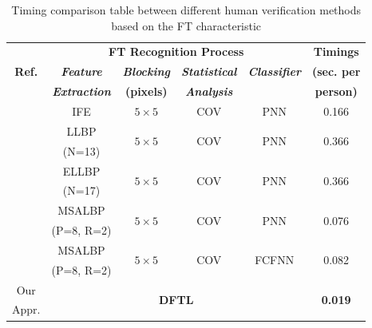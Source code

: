 \documentclass[conference]{IEEEtran}
\begin{document}
\begin{table}[]
\centering
\caption{Timing comparison table between different human verification methods based on the FT characteristic}
\label{Table:timing}
\begin{tabular}{|c|c|c|c|c|c|}
\hline
\multirow{3}{*}{\textbf{Ref.}} & \multicolumn{4}{c|}{\textbf{FT Recognition Process}} & \textbf{Timings} \\ \cline{2-5}
& \textbf{\textit{Feature}} &  \textbf{\textit{Blocking}} & \textbf{\textit{Statistical}} & \textbf{\textit{Classifier}} & \textbf{(sec. per}   \\ 
 & \textbf{\textit{Extraction}} & \textbf{(pixels)}&  \textbf{\textit{Analysis}} & & \textbf{person)}  \\ \hline
\cite{Al-Nima2015Human} &  IFE & $5 \times 5$ & COV & PNN & 0.166\\ \hline
\multirow{2}{*}{\cite{Al-Nima2017efficient}} & LLBP \cite{Petpon2009Face}  & \multirow{2}{*}{$5 \times 5$} & \multirow{2}{*}{COV} & \multirow{2}{*}{PNN} & \multirow{2}{*}{0.366}\\ 
& (N=13) & & & &\\ \hline
\multirow{2}{*}{\cite{Al-Nima2016Robust}}  & ELLBP  & \multirow{2}{*}{$5 \times 5$} & \multirow{2}{*}{COV} & \multirow{2}{*}{PNN} & \multirow{2}{*}{0.366}\\ 
& (N=17)  & & & &\\ \hline
\multirow{2}{*}{\cite{Al-Nima2017finger}} & MSALBP& \multirow{2}{*}{$5 \times 5$} & \multirow{2}{*}{COV} & \multirow{2}{*}{PNN} &\multirow{2}{*}{0.076}\\ 
 & (P=8, R=2)  & & & &\\ \hline
\multirow{2}{*}{\cite{Al-Nima2017finger}} & MSALBP  & \multirow{2}{*}{$5 \times 5$} & \multirow{2}{*}{COV} & \multirow{2}{*}{FCFNN} & \multirow{2}{*}{0.082}\\ 
 & (P=8, R=2)  & & & &\\ \hline
Our & \multicolumn{4}{c|}{\multirow{2}{*}{\textbf{DFTL}}}  & \multirow{2}{*}{\textbf{0.019}} \\ 
Appr. & \multicolumn{4}{c|}{}  & \\ \hline
\end{tabular}
\end{table}

\end{document}
